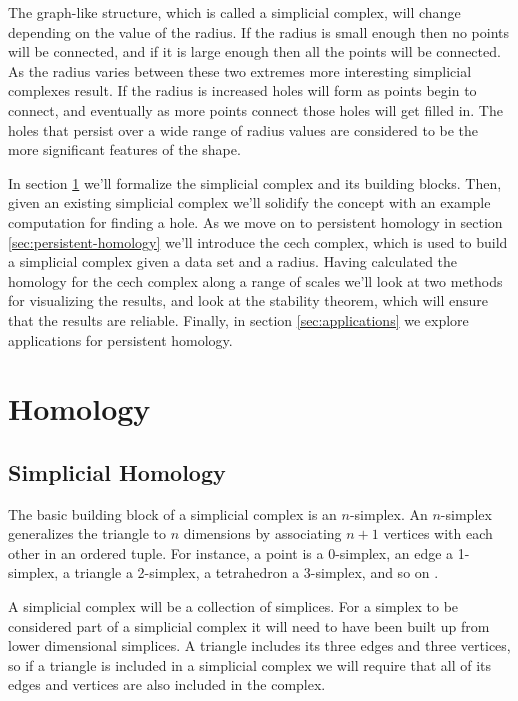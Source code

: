 The graph-like structure, which is called a simplicial complex, will change depending on the value of the radius.
If the radius is small enough then no points will be connected, and if it is large enough then all the points will be connected.
As the radius varies between these two extremes more interesting simplicial complexes result.
If the radius is increased holes will form as points begin to connect, and eventually as more points connect those holes will get filled in.
The holes that persist over a wide range of radius values are considered to be the more significant features of the shape.

In section \ref{sec:homology} we'll formalize the simplicial complex and its building blocks.
Then, given an existing simplicial complex we'll solidify the concept with an example computation for finding a hole.
As we move on to persistent homology in section \ref{sec:persistent-homology} we'll introduce the cech complex, which is used to build a simplicial complex given a data set and a radius.
Having calculated the homology for the cech complex along a range of scales we'll look at two methods for visualizing the results, and  look at the stability theorem, which will ensure that the results are reliable.
Finally, in section \ref{sec:applications} we  explore applications for persistent homology.

\section{Homology}\label{sec:homology}

\subsection{Simplicial Homology}\label{sec:simplicial-homology}

The basic building block of a simplicial complex is an \(n\)-simplex. %
An \(n\)-simplex generalizes the triangle to \(n\) dimensions by associating \(n+1\) vertices with each other in an ordered tuple.
For instance, a point is a 0-simplex, an edge a 1-simplex, a triangle a 2-simplex, a tetrahedron a 3-simplex, and so on .

\begin{figure}
    
    \caption{}
    \label{fig:basic-simplices}
\end{figure}

A simplicial complex will be a collection of simplices.
For a simplex to be considered part of a simplicial complex it will need to have been built up from lower dimensional simplices.
A triangle includes its three edges and three vertices, so if a triangle is included in a simplicial complex we will require that all of its edges and vertices are also included in the complex.

